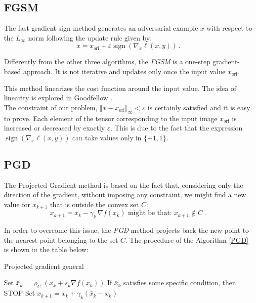 \documentclass[10pt,twocolumn,letterpaper, english]{article}
\newcommand{\sign}{\mathop{\mathrm{sign}}}
\theoremstyle{definition}
\theoremstyle{plain}
\theoremstyle{plain}
\theoremstyle{plain}
\theoremstyle{plain}
\theoremstyle{remark}
\theoremstyle{remark}
\theoremstyle{definition}
\theoremstyle{definition}
\theoremstyle{definition}
\theoremstyle{definition}
\renewcommand{\epsilon}{\varepsilon}
\renewcommand{\rho}{\varrho}
\begin{document}
\subsection{FGSM}

The fast gradient sign method generates an adversarial example $x$ with respect to the $L_{\infty}$ norm following the update rule given by:
\begin{equation*}
    x= x_{\text{ori}} + \epsilon \sign (\nabla_x \ell(x,y)) \,.
\end{equation*}

Differently from the other three algorithms, the \textit{FGSM} is a one-step gradient-based approach. 
It is not iterative and updates only once the input value $x_{\text{ori}}$. 

This method linearizes the cost function around the input value. The idea of linearity is explored in Goodfellow \cite{goodfellow}. \\

The constraint of our problem, $\Vert x - x_{\text{ori}} \Vert_\infty  < \epsilon$ is certainly satisfied and it is easy to prove. 
Each element of the tensor corresponding to the input image $x_{\text{ori}}$ is increased or decreased by exactly $\epsilon$. 
This is due to the fact that the expression  $\sign (\nabla_x \ell(x,y))$  can take values only in $\{-1, 1\}$. 

\subsection{PGD}

The Projected Gradient method is based on the fact that, considering only the direction of the gradient, without imposing any constraint, we might find a new value for $x_{k+1}$ that is outside the convex set $C$: 
\begin{equation*}
    x_{k+1} = x_k - \gamma_k \, \nabla f(x_k) \text{   might be that: } x_{k+1} \notin C \,\,.
\end{equation*}

In order to overcome this issue, the \textit{PGD} method projects back the new point to the nearest point belonging to the set $C$. 
The procedure of the Algorithm \ref{PGD} is shown in the table below: 

\begin{algorithm}
\caption{Projected gradient general}\label{PGD}
\begin{algorithmic}[1]
  \State Set $ \bar{x}_k = \rho_C(x_k + s_k \nabla f(x_k))$ 
  \State If $\bar{x}_k$ satisfies some specific condition, then STOP
  \State Set $x_{k+1} = x_k + \gamma_k (\bar{x}_k - x_k)$ \Comment{with $\gamma_k \in (0, 1]$}
    
\EndFor
\end{algorithmic}
\end{algorithm}
\end{document}
